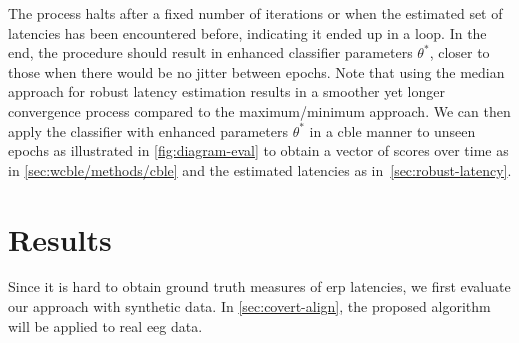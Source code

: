 The process halts after a fixed number of iterations or when the estimated set
of latencies has been encountered before, indicating it ended up in a loop.
In the end, the procedure should result in enhanced classifier parameters $\theta^*$,
closer to those when there would be no jitter between epochs.
Note that using the median approach for robust latency estimation results in a
smoother yet longer convergence process compared to the maximum/minimum approach.
We can then apply the classifier with enhanced parameters $\theta^*$ in a \ac{cble}
manner to unseen epochs as illustrated in \cref{fig:diagram-eval} to obtain a
vector of scores over time as in \cref{sec:wcble/methods/cble} and the estimated latencies as
in~\cref{sec:robust-latency}.
\section{Results}
\label{sec:wcble/results}
Since it is hard to obtain ground truth measures of \ac{erp} latencies, we
first evaluate our approach with synthetic data.
In \cref{sec:covert-align}, the proposed algorithm will be applied to real
\ac{eeg} data.

